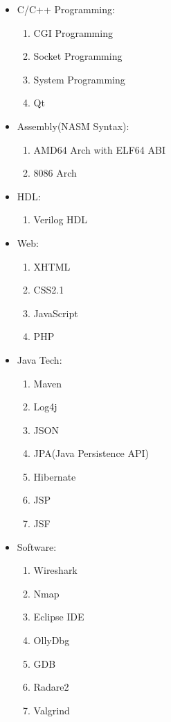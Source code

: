 \documentclass{res}
\begin{document}
\begin{resume}
	\begin{itemize}
		\item{C/C++ Programming:}
			\begin{enumerate}
				\item{CGI Programming}
				\item{Socket Programming}
				\item{System Programming}
				\item{Qt}	
			\end{enumerate}
		\item{Assembly(NASM Syntax):}
			\begin{enumerate}
				\item{AMD64 Arch with ELF64 ABI}
				\item{8086 Arch}
			\end{enumerate}
		\item{HDL:}
			\begin{enumerate}
				\item{Verilog HDL}
			\end{enumerate}
		\item{Web:}
			\begin{enumerate}
				\item{XHTML}
				\item{CSS2.1}
				\item{JavaScript}
				\item{PHP}
			\end{enumerate}
		\item{Java Tech:}
			\begin{enumerate}
				\item{Maven}
				\item{Log4j}
				\item{JSON}
				\item{JPA(Java Persistence API)}
				\item{Hibernate}
				\item{JSP}
				\item{JSF}
			\end{enumerate}
		\item{Software:}
			\begin{enumerate}
				\item{Wireshark}
				\item{Nmap}
				\item{Eclipse IDE}
				\item{OllyDbg}
				\item{GDB}
				\item{Radare2}
				\item{Valgrind}

\end{enumerate}
\end{itemize}
\end{resume}
\end{document}
